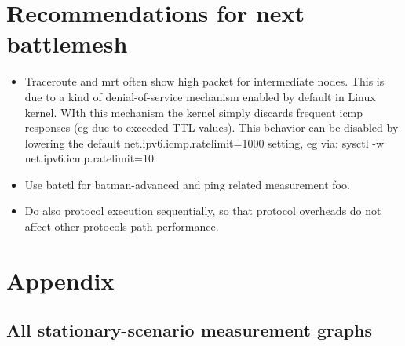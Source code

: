 \documentclass[a4paper,12pt,twoside]{article}
\begin{document}


\section{Recommendations for next battlemesh}

\begin{itemize}

\item Traceroute and mrt often show high packet for intermediate
  nodes. This is due to a kind of denial-of-service mechanism enabled
  by default in Linux kernel. WIth this mechanism the kernel simply
  discards frequent icmp responses (eg due to exceeded TTL
  values). This behavior can be disabled by lowering the default
  net.ipv6.icmp.ratelimit=1000 setting, eg via: sysctl -w
  net.ipv6.icmp.ratelimit=10

\item Use batctl for batman-advanced and ping related measurement foo.

\item Do also protocol execution sequentially, so that protocol
  overheads do not affect other protocols path performance.

\end{itemize}


\section{Appendix}


\subsection{All stationary-scenario measurement graphs}

\end{document}
